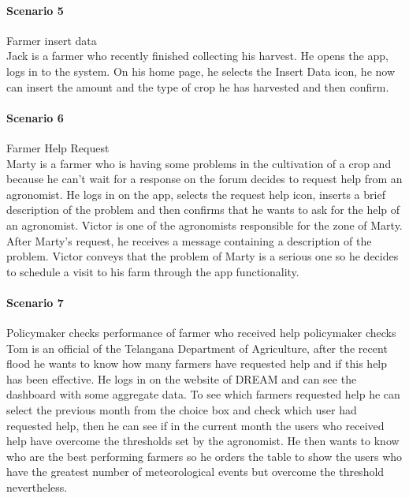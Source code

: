 \bigskip
\paragraph{Scenario 5} Farmer insert data\\
Jack is a farmer who recently finished collecting his harvest. He opens the app, logs in to the system. On his home page, 
he selects the Insert Data icon, he now can insert the amount and the type of crop he has harvested and then confirm.

\bigskip
\paragraph{Scenario 6} Farmer Help Request\\
Marty is a farmer who is having some problems in the cultivation of a crop and because he can't wait for a response on the 
forum decides to request help from an agronomist. He logs in on the app, selects the request help icon, inserts a brief description 
of the problem and then confirms that he wants to ask for the help of an agronomist. Victor is one of the agronomists responsible 
for the zone of Marty. After Marty's request, he receives a message containing a description of the problem. Victor conveys that the 
problem of Marty is a serious one so he decides to schedule a visit to his farm through the app functionality.

\bigskip
\paragraph{Scenario 7} Policymaker checks performance of farmer who received help
policymaker checks 
Tom is an official of the Telangana Department of Agriculture, after the recent flood he wants to know how many farmers have requested 
help and if this help has been effective. He logs in on the website of DREAM and can see the dashboard with some aggregate data. 
To see which farmers requested help he can select the previous month from the choice box and check which user had requested help, 
then he can see if in the current month the users who received help have overcome the thresholds set by the agronomist. He then wants 
to know who are the best performing farmers so he orders the table to show the users who have the greatest number of meteorological 
events but overcome the threshold nevertheless.